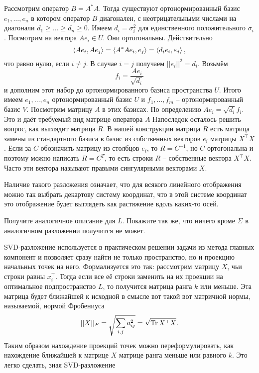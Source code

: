 \proof Рассмотрим оператор $B = A^{*}A$. Тогда существуют ортонормированный базис $e_1,\dots,e_n$ в котором оператор $B$ диагонален, с неотрицательными числами на диагонали $d_1\geq\dots\geq d_n\geq 0$. Имеем  $d_i=\sigma_i^2$ для единственного положительного $\sigma_i$. 
Посмотрим на вектора $Ae_i \in U$. Они ортогональны. Действительно
$$\left\langle Ae_i, Ae_j\right\rangle = \left\langle A^{*}Ae_i,e_j \right\rangle = \left\langle d_i e_i,e_j\right\rangle,$$
что равно нулю, если $i\neq j$. В случае $i=j$ получаем $||e_i||^2=d_i$. Возьмём 
$$f_i=\frac{Ae_i}{\sqrt{d_i}}$$
и дополним этот набор до ортонормированного базиса пространства $U$. Итого имеем $e_1,\dots,e_n$ ортонормированный базис $U$ и $f_1,\dots,f_m$ -- ортонормированный базис $V$.
Посмотрим матрицу $A$ в этих базисах. По определению $Ae_i=\sqrt{d_i}f_i$. Это и даёт требуемый вид матрице оператора $A$
Напоследок осталось решить вопрос, как выглядит матрица $R$. В нашей конструкции матрица $R$ есть матрица замены из стандартного базиса в базис из собственных векторов $e_i$ матрицы $X^{\top}X$. Если за $C$ обозначить матрицу из столбцов $e_i$, то $R=C^{-1}$, но $C$ ортогональна и поэтому можно написать $R=C^{T}$, то есть строки $R$ -- собственные вектора $X^{\top}X$. Часто эти вектора называют правыми сингулярными векторами $X$.

\endproof
\ethrm

Наличие такого разложения означает, что для всякого линейного отображения можно так выбрать декартову систему координат, что в этой системе координат это отображение будет выглядеть как растяжение вдоль каких-то осей.

\zd Получите аналогичное описание для $L$. Покажите так же, что ничего кроме $\Sigma$ в аналогичном разложении получится не может.
\ezd

SVD-разложение используется в практическом решении задачи из метода главных компонент и позволяет сразу найти не только пространство, но и проекцию начальных точек на него. Формализуется это так: рассмотрим матрицу $X$, чьи строки равны $x_i^{\top}$. Тогда если все её строки заменить на их проекции на оптимальное подпространство $L$, то получится матрица ранга $k$ или меньше. Эта матрица будет ближайшей к исходной в смысле вот такой вот матричной нормы, называемой, нормой Фробениуса 
$$||X||_F=\sqrt{\sum_{i,j} a_{ij}^2}=\sqrt{\operatorname{Tr} X^{\top}X}.$$
Таким образом нахождение проекций точек можно переформулировать, как нахождение ближайшей к матрице $X$ матрице ранга меньше или равного $k$. Это легко сделать, зная SVD-разложение

